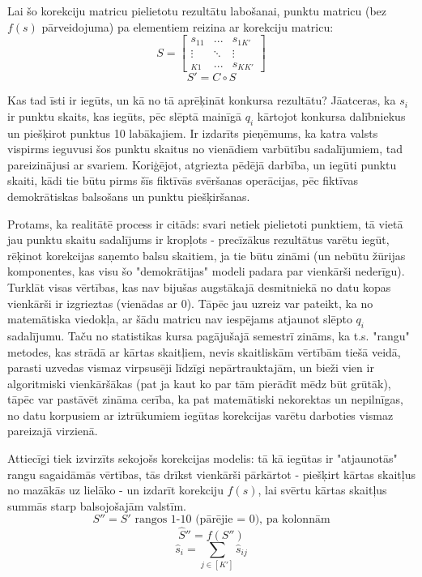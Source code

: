 \documentclass[12pt, a4paper]{article}
\begin{document}
Lai šo korekciju matricu pielietotu rezultātu labošanai, punktu matricu (bez $f(s)$ pārveidojuma) pa elementiem reizina ar korekciju matricu:
\begin{equation}
    S=
    \begin{bmatrix}
        s_{11} &  ... & s_{1K'} \\
        \vdots & \ddots & \vdots \\
        _{K1} &  ... & s_{KK'} 
    \end{bmatrix}
\end{equation}
\begin{equation}
    S' = C \circ S
\end{equation}

Kas tad īsti ir iegūts, un kā no tā aprēķināt konkursa rezultātu? Jāatceras, ka $s_i$ ir punktu skaits, kas iegūts, pēc slēptā mainīgā $q_i$ kārtojot konkursa dalībniekus un piešķirot punktus 10 labākajiem. Ir izdarīts pieņēmums, ka katra valsts vispirms ieguvusi šos punktu skaitus no vienādiem varbūtību sadalījumiem, tad pareizinājusi ar svariem. Koriģējot, atgriezta pēdējā darbība, un iegūti punktu skaiti, kādi tie būtu pirms šīs fiktīvās svēršanas operācijas, pēc fiktīvas demokrātiskas balsošans un punktu piešķiršanas. 

Protams, ka realitātē process ir citāds: svari netiek pielietoti punktiem, tā vietā jau punktu skaitu sadalījums ir kropļots - precīzākus rezultātus varētu iegūt, rēķinot korekcijas saņemto balsu skaitiem, ja tie būtu zināmi (un nebūtu žūrijas komponentes, kas visu šo "demokrātijas" modeli padara par vienkārši nederīgu). Turklāt visas vērtības, kas nav bijušas augstākajā desmitniekā no datu kopas vienkārši ir izgrieztas (vienādas ar 0). Tāpēc jau uzreiz var pateikt, ka no matemātiska viedokļa, ar šādu matricu nav iespējams atjaunot slēpto $q_i$ sadalījumu. Taču no statistikas kursa pagājušajā semestrī zināms, ka t.s. "rangu" metodes, kas strādā ar kārtas skaitļiem, nevis skaitliskām vērtībām tiešā veidā, parasti uzvedas vismaz virpsusēji līdzīgi nepārtrauktajām, un bieži vien ir algoritmiski vienkāršākas (pat ja kaut ko par tām pierādīt mēdz būt grūtāk), tāpēc var pastāvēt zināma cerība, ka pat matemātiski nekorektas un nepilnīgas, no datu korpusiem ar iztrūkumiem iegūtas korekcijas varētu darboties vismaz pareizajā virzienā.

Attiecīgi tiek izvirzīts sekojošs korekcijas modelis: tā kā iegūtas ir "atjaunotās" rangu sagaidāmās vērtības, tās drīkst vienkārši pārkārtot - piešķirt kārtas skaitļus no mazākās uz lielāko - un izdarīt korekciju $f(s)$, lai svērtu kārtas skaitļus summās starp balsojošajām valstīm.
\begin{equation}
    S'' = S' \text{ rangos 1-10 (pārējie = 0), pa kolonnām}
\end{equation}
\begin{equation}
    \hat S'' = f(S'')
\end{equation}
\begin{equation}
    \hat s_i = \sum_{j \in [K']}\hat s_{ij}
\end{equation}
\end{document}
